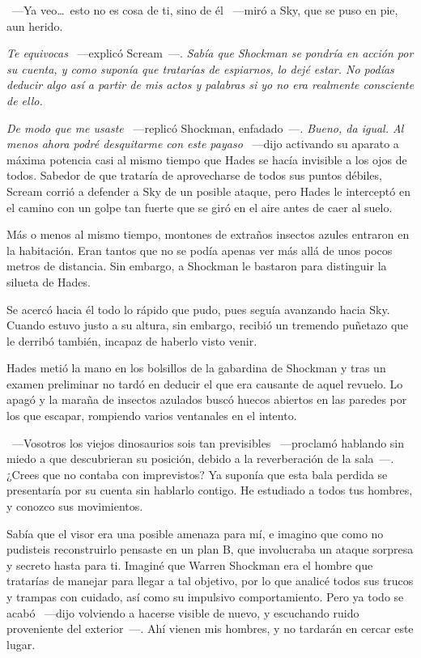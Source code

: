 ~---Ya veo\dots\ esto no es cosa de ti, sino de él ~---miró a Sky, que se puso en pie, aun herido.

\emph{Te equivocas} ~---explicó Scream~---. \emph{Sabía que Shockman se pondría en acción por su cuenta, y como suponía que tratarías de espiarnos, lo dejé estar. No podías deducir algo así a partir de mis actos y palabras si yo no era realmente consciente de ello.}

\emph{De modo que me usaste} ~---replicó Shockman, enfadado~---. \emph{Bueno, da igual. Al menos ahora podré desquitarme con este payaso} ~---dijo activando su aparato a máxima potencia casi al mismo tiempo que Hades se hacía invisible a los ojos de todos. Sabedor de que trataría de aprovecharse de todos sus puntos débiles, Scream corrió a defender a Sky de un posible ataque, pero Hades le interceptó en el camino con un golpe tan fuerte que se giró en el aire antes de caer al suelo.

Más o menos al mismo tiempo, montones de extraños insectos azules entraron en la habitación. Eran tantos que no se podía apenas ver más allá de unos pocos metros de distancia. Sin embargo, a Shockman le bastaron para distinguir la silueta de Hades.

Se acercó hacia él todo lo rápido que pudo, pues seguía avanzando hacia Sky. Cuando estuvo justo a su altura, sin embargo, recibió un tremendo puñetazo que le derribó también, incapaz de haberlo visto venir.

Hades metió la mano en los bolsillos de la gabardina de Shockman y tras un examen preliminar no tardó en deducir el que era causante de aquel revuelo. Lo apagó y la maraña de insectos azulados buscó huecos abiertos en las paredes por los que escapar, rompiendo varios ventanales en el intento.

~---Vosotros los viejos dinosaurios sois tan previsibles ~---proclamó hablando sin miedo a que descubrieran su posición, debido a la reverberación de la sala~---. ¿Crees que no contaba con imprevistos? Ya suponía que esta bala perdida se presentaría por su cuenta sin hablarlo contigo. He estudiado a todos tus hombres, y conozco sus movimientos.

\rquoti Sabía que el visor era una posible amenaza para mí, e imagino que como no pudisteis reconstruirlo pensaste en un plan B, que involucraba un ataque sorpresa y secreto hasta para ti. Imaginé que Warren Shockman era el hombre que tratarías de manejar para llegar a tal objetivo, por lo que analicé todos sus trucos y trampas con cuidado, así como su impulsivo comportamiento. Pero ya todo se acabó ~---dijo volviendo a hacerse visible de nuevo, y escuchando ruido proveniente del exterior~---. Ahí vienen mis hombres, y no tardarán en cercar este lugar.


